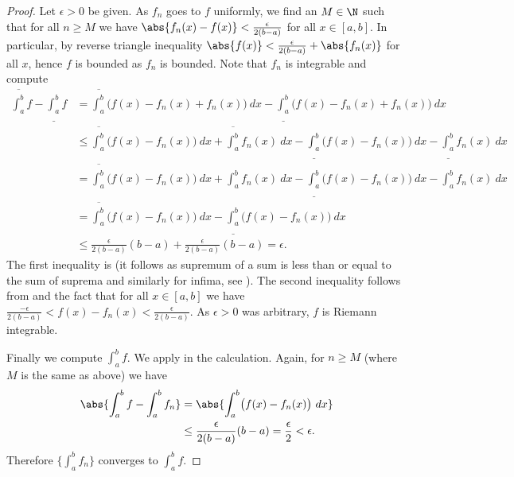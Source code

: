 \documentclass[12pt]{book}
\begin{document}
\begin{proof}
Let $\epsilon > 0$ be given.
As $f_n$ goes to $f$ uniformly, we find an $M \in \N$ such that
for all $n \geq M$ we have 
$\abs{f_n(x)-f(x)} < \frac{\epsilon}{2(b-a)}$ for all $x \in [a,b]$.
In particular, by reverse triangle inequality
$\abs{f(x)} < \frac{\epsilon}{2(b-a)} + \abs{f_n(x)}$ for all $x$,
hence $f$ is bounded
as $f_n$ is bounded.
Note that $f_n$ is integrable and compute
\begin{equation*}
\begin{split}
\overline{\int_a^b} f
-
\underline{\int_a^b} f
& =
\overline{\int_a^b} \bigl( f(x) - f_n(x) + f_n(x) \bigr)~dx
-
\underline{\int_a^b} \bigl( f(x) - f_n(x) + f_n(x) \bigr)~dx
\\
& \leq
\overline{\int_a^b} \bigl( f(x) - f_n(x) \bigr)~dx +  \overline{\int_a^b} f_n(x) ~dx
-
\underline{\int_a^b} \bigl( f(x) - f_n(x) \bigr)~dx -  \underline{\int_a^b} f_n(x) ~dx
\\
& =
\overline{\int_a^b} \bigl( f(x) - f_n(x) \bigr)~dx +  \int_a^b f_n(x) ~dx
-
\underline{\int_a^b} \bigl( f(x) - f_n(x) \bigr)~dx -  \int_a^b f_n(x) ~dx
\\
& =
\overline{\int_a^b} \bigl( f(x) - f_n(x) \bigr)~dx
-
\underline{\int_a^b} \bigl( f(x) - f_n(x) \bigr)~dx
\\
& \leq
\frac{\epsilon}{2(b-a)} (b-a) + 
\frac{\epsilon}{2(b-a)} (b-a) = \epsilon .
\end{split}
\end{equation*}
The first inequality is 
(it follows as supremum of a sum is less than or equal to the sum of
suprema and similarly for infima, see ).
The second inequality follows from  and 
the fact that for all $x \in [a,b]$ we have
$\frac{-\epsilon}{2(b-a)} < f(x)-f_n(x) < \frac{\epsilon}{2(b-a)}$.
As $\epsilon > 0$ was arbitrary, $f$ is Riemann integrable.

Finally we compute $\int_a^b f$.
We apply 
in the calculation.
Again, for $n \geq M$ (where $M$ is the same as above) we have
\begin{equation*}
\begin{split}
\abs{\int_a^b f - \int_a^b f_n} & = 
\abs{ \int_a^b \bigl(f(x) - f_n(x)\bigr)~dx}
\\
& \leq
\frac{\epsilon}{2(b-a)} (b-a) = \frac{\epsilon}{2} < \epsilon .
\end{split}
\end{equation*}
Therefore $\{ \int_a^b f_n \}$ converges to $\int_a^b f$.
\end{proof}
\end{document}
